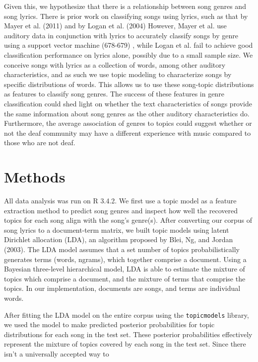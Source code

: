 \documentclass[12pt, titlepage]{article}
\begin{document}
Given this, we hypothesize that there is a relationship between song genres and song lyrics. There is prior work on classifying songs using lyrics, such as that by Mayer et al. (2011) and by Logan et al. (2004) However, Mayer et al. use auditory data in conjunction with lyrics to accurately classify songs by genre using a support vector machine (678-679) \cite{mayer_2011}, while Logan et al. fail to achieve good classification performance on lyrics alone, possibly due to a small sample size. \cite{logan_2004} We conceive songs with lyrics as a collection of words, among other auditory characteristics, and as such we use topic modeling to characterize songs by specific distributions of words. This allows us to use these song-topic distributions as features to classify song genres. The success of these features in genre classification could shed light on whether the text characteristics of songs provide the same information about song genres as the other auditory characteristics do. Furthermore, the average association of genres to topics could suggest whether or not the deaf community may have a different experience with music compared to those who are not deaf.

\section{Methods}
All data analysis was run on R 3.4.2. We first use a topic model as a feature extraction method to predict song genres and inspect how well the recovered topics for each song align with the song's genre(s). After converting our corpus of song lyrics to a document-term matrix, we built topic models using latent Dirichlet allocation (LDA), an algorithm proposed by Blei, Ng, and Jordan (2003). \cite{blei} The LDA model assumes that a set number of topics probabilistically generates terms (words, ngrams), which together comprise a document. \cite{blei_2002} Using a Bayesian three-level hierarchical model, LDA is able to estimate the mixture of topics which comprise a document, and the mixture of terms that comprise the topics. In our implementation, documents are songs, and terms are individual words.

After fitting the LDA model on the entire corpus using the \texttt{topicmodels} library, we used the model to make predicted posterior probabilities for topic distributions for each song in the test set. These posterior probabilities effectively represent the mixture of topics covered by each song in the test set. Since there isn't a universally accepted way to
\end{document}
